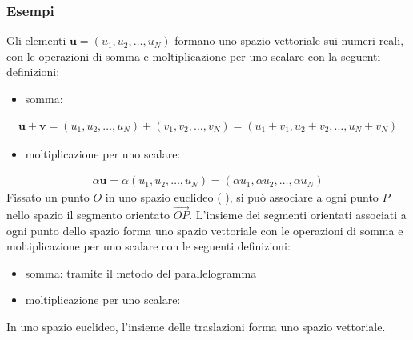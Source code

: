 \documentclass[letterpaper,10pt,italian]{jupyterBook}
\begin{document}
\subsubsection{Esempi}
\label{\detokenize{ch/algebra/vector-algebra-def:esempi}}\label{\detokenize{ch/algebra/vector-algebra-def:math-hs-algebra-vector-def-examples}}
\sphinxAtStartPar
{}
Gli elementi \(\mathbf{u} = (u_1, u_2, \dots, u_N)\) formano uno spazio vettoriale sui numeri reali, con le operazioni di somma e moltiplicazione per uno scalare con la seguenti definizioni:
\begin{itemize}
\item {} 
\sphinxAtStartPar
somma:

\end{itemize}
\begin{equation*}
\begin{split}
  \mathbf{u} + \mathbf{v} = (u_1, u_2, \dots, u_N) + (v_1, v_2, \dots, v_N) = (u_1+v_1, u_2+v_2, \dots, u_N+v_N)
\end{split}
\end{equation*}\begin{itemize}
\item {} 
\sphinxAtStartPar
moltiplicazione per uno scalare:

\end{itemize}
\begin{equation*}
\begin{split}
  \alpha \mathbf{u}       = \alpha (u_1, u_2, \dots, u_N)                   = (\alpha u_1, \alpha u_2, \dots, \alpha u_N)
\end{split}
\end{equation*}
\sphinxAtStartPar
{}
Fissato un punto \(O\) in uno spazio euclideo ( ), si può associare a ogni punto \(P\) nello spazio il segmento orientato \(\overrightarrow{OP}\). L’insieme dei segmenti orientati associati a ogni punto dello spazio forma uno spazio vettoriale con le operazioni di somma e moltiplicazione per uno scalare con le seguenti definizioni:
\begin{itemize}
\item {} 
\sphinxAtStartPar
somma: tramite il metodo del parallelogramma 

\item {} 
\sphinxAtStartPar
moltiplicazione per uno scalare: 

\end{itemize}
\label{\detokenize{ch/algebra/vector-algebra-def:math-hs-algebra-vector-def-example-translations}}
\sphinxAtStartPar
{} In uno spazio euclideo, l’insieme delle traslazioni forma uno spazio vettoriale.
\end{document}
